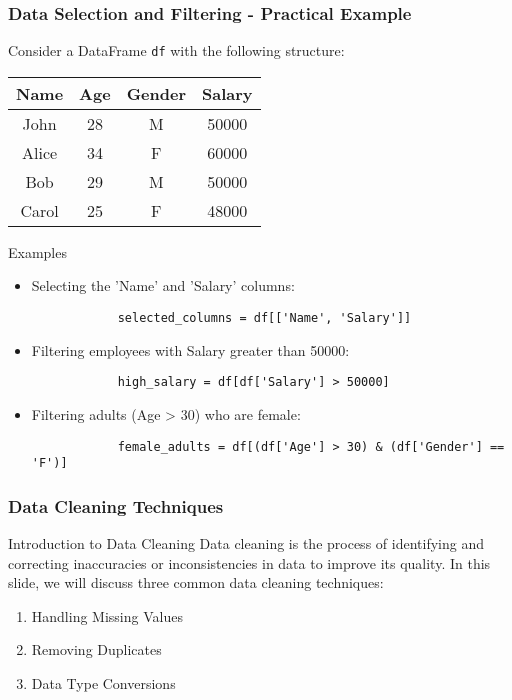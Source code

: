 \documentclass[aspectratio=169]{beamer}
\begin{document}
\begin{frame}[fragile]
    \frametitle{Data Selection and Filtering - Practical Example}
    Consider a DataFrame \texttt{df} with the following structure:
    
    \begin{center}
    \begin{tabular}{|c|c|c|c|}
    \hline
    Name & Age & Gender & Salary \\
    \hline
    John & 28 & M & 50000 \\
    Alice & 34 & F & 60000 \\
    Bob & 29 & M & 50000 \\
    Carol & 25 & F & 48000 \\
    \hline
    \end{tabular}
    \end{center}

    \begin{block}{Examples}
        \begin{itemize}
            \item Selecting the 'Name' and 'Salary' columns:
            \begin{lstlisting}
            selected_columns = df[['Name', 'Salary']]
            \end{lstlisting}

            \item Filtering employees with Salary greater than 50000:
            \begin{lstlisting}
            high_salary = df[df['Salary'] > 50000]
            \end{lstlisting}

            \item Filtering adults (Age > 30) who are female:
            \begin{lstlisting}
            female_adults = df[(df['Age'] > 30) & (df['Gender'] == 'F')]
            \end{lstlisting}
        \end{itemize}
    \end{block}
\end{frame}

\begin{frame}
  \frametitle{Data Cleaning Techniques}
  \begin{block}{Introduction to Data Cleaning}
    Data cleaning is the process of identifying and correcting inaccuracies or inconsistencies in data to improve its quality. In this slide, we will discuss three common data cleaning techniques:
    \begin{enumerate}
      \item Handling Missing Values
      \item Removing Duplicates
      \item Data Type Conversions
    \end{enumerate}
  \end{block}
\end{frame}
\end{document}
